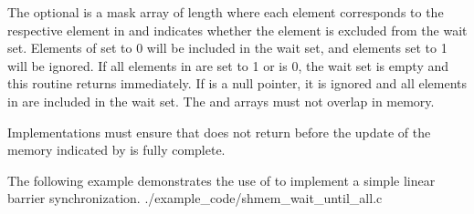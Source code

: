 \begin{apidefinition}
{    The optional  is a mask array of length  where each
    element corresponds to the respective element in  and indicates
    whether the element is excluded from the wait set.  Elements of
     set to 0 will be included in the wait set, and elements set to
    1 will be ignored.  If all elements in  are set to 1 or
     is 0, the wait set is empty and this routine returns
    immediately.  If  is a null pointer, it is ignored and
    all elements in  are included in the wait set.  The 
    and  arrays must not overlap in memory.

    Implementations must ensure that  does not
    return before the update of the memory indicated by  is fully
    complete.
}





\begin{apiexamples}
  \apicexample
      {The following \Cstd[11] example demonstrates the use of
       to implement a simple linear barrier
      synchronization.}
      {./example_code/shmem_wait_until_all.c}
      {}

\end{apiexamples}

\end{apidefinition}
